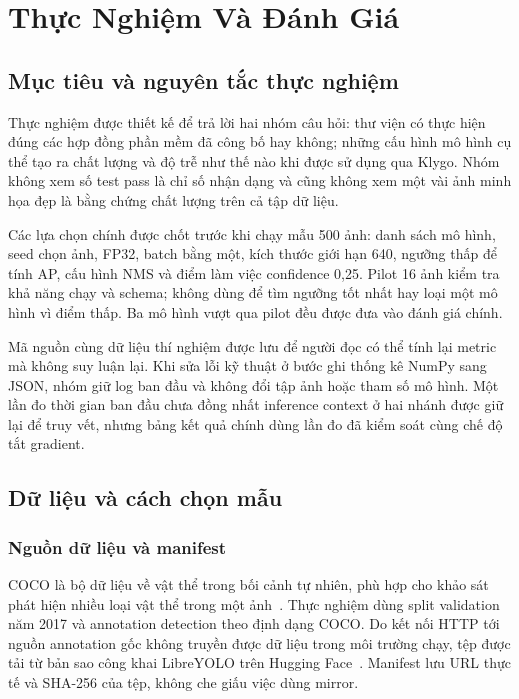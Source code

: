 \chapter{Thực Nghiệm Và Đánh Giá}
\label{chap:experiments}
\section{Mục tiêu và nguyên tắc thực nghiệm}
Thực nghiệm được thiết kế để trả lời hai nhóm câu hỏi: thư viện có thực hiện đúng các hợp đồng phần mềm đã công bố hay không; những cấu hình mô hình cụ thể tạo ra chất lượng và độ trễ như thế nào khi được sử dụng qua Klygo. Nhóm không xem số test pass là chỉ số nhận dạng và cũng không xem một vài ảnh minh họa đẹp là bằng chứng chất lượng trên cả tập dữ liệu.

Các lựa chọn chính được chốt trước khi chạy mẫu 500 ảnh: danh sách mô hình, seed chọn ảnh, FP32, batch bằng một, kích thước giới hạn 640, ngưỡng thấp để tính AP, cấu hình NMS và điểm làm việc confidence 0,25. Pilot 16 ảnh kiểm tra khả năng chạy và schema; không dùng để tìm ngưỡng tốt nhất hay loại một mô hình vì điểm thấp. Ba mô hình vượt qua pilot đều được đưa vào đánh giá chính.

Mã nguồn cùng dữ liệu thí nghiệm được lưu để người đọc có thể tính lại metric mà không suy luận lại. Khi sửa lỗi kỹ thuật ở bước ghi thống kê NumPy sang JSON, nhóm giữ log ban đầu và không đổi tập ảnh hoặc tham số mô hình. Một lần đo thời gian ban đầu chưa đồng nhất inference context ở hai nhánh được giữ lại để truy vết, nhưng bảng kết quả chính dùng lần đo đã kiểm soát cùng chế độ tắt gradient.

\section{Dữ liệu và cách chọn mẫu}
\subsection{Nguồn dữ liệu và manifest}
COCO là bộ dữ liệu về vật thể trong bối cảnh tự nhiên, phù hợp cho khảo sát phát hiện nhiều loại vật thể trong một ảnh~\cite{lin2014coco}. Thực nghiệm dùng split validation năm 2017 và annotation detection theo định dạng COCO. Do kết nối HTTP tới nguồn annotation gốc không truyền được dữ liệu trong môi trường chạy, tệp  được tải từ bản sao công khai LibreYOLO trên Hugging Face~\cite{cocomirror}. Manifest lưu URL thực tế và SHA-256 của tệp, không che giấu việc dùng mirror.

